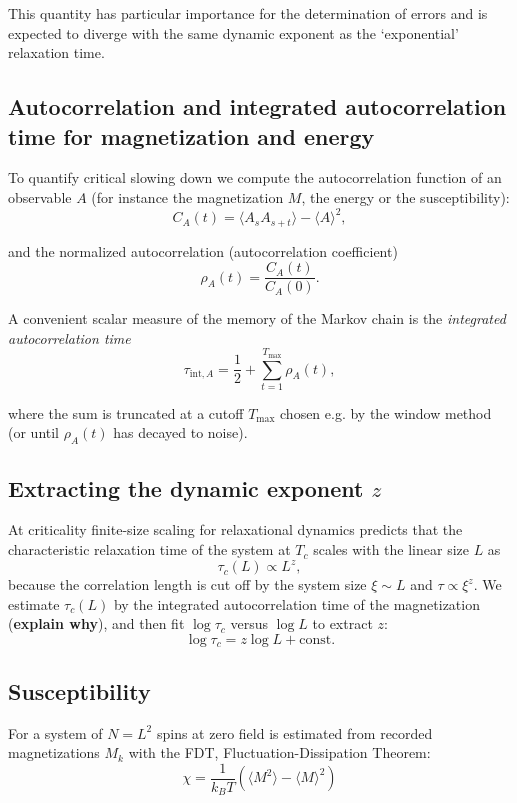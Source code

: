 \documentclass{article}
\begin{document}
This quantity has particular importance for the determination of errors and
is expected to diverge with the same dynamic exponent as the `exponential'
relaxation time.

\subsection{Autocorrelation and integrated autocorrelation time for magnetization and energy}
To quantify critical slowing down we compute the autocorrelation function of
an observable \(A\) (for instance the magnetization \(M\), the energy or the susceptibility):
\begin{equation}
C_A(t) = \langle A_{s} A_{s+t}\rangle - \langle A\rangle^2,
\end{equation}

and the normalized autocorrelation (autocorrelation coefficient)
\begin{equation}
\rho_A(t) = \frac{C_A(t)}{C_A(0)}.
\end{equation}

A convenient scalar measure of the memory of the Markov chain is the
\emph{integrated autocorrelation time}
\begin{equation}
\tau_{\mathrm{int},A} = \frac{1}{2} + \sum_{t=1}^{T_{\max}} \rho_A(t),
\end{equation}

where the sum is truncated at a cutoff \(T_{\max}\) chosen e.g. by the window
method (or until \(\rho_A(t)\) has decayed to noise).

\subsection{Extracting the dynamic exponent \(z\)}
At criticality finite-size scaling for relaxational dynamics predicts that
the characteristic relaxation time of the system at \(T_c\) scales with the
linear size \(L\) as
\begin{equation}
\tau_c(L) \propto L^{z},
\end{equation}
because the correlation length is cut off by the system size \(\xi\sim L\)
and \(\tau\propto\xi^{z}\). We estimate \(\tau_c(L)\) by the
integrated autocorrelation time of the magnetization (\textbf{explain why}),
and then fit \(\log \tau_c\) versus \(\log L\) to extract \(z\):
\begin{equation}
\log \tau_c = z \log L + \text{const}.
\end{equation}

\subsection{Susceptibility}
For a system of \(N=L^2\) spins at zero field is estimated from recorded
magnetizations \(M_k\) with the FDT, Fluctuation-Dissipation Theorem: 
\begin{equation}
\chi = \frac{1}{k_B T} \left( \langle M^2 \rangle - \langle M \rangle^2 \right)
\end{equation}
\end{document}
